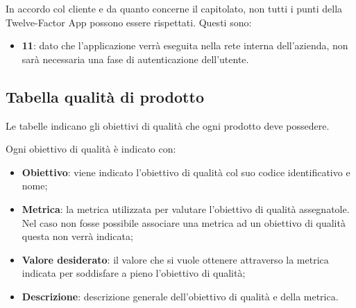 In accordo col cliente \II e da quanto concerne il capitolato, non tutti i punti della Twelve-Factor App possono essere rispettati. Questi sono:

\begin{itemize} %
	\item \textbf{11}: dato che l'applicazione verrà eseguita nella rete interna dell'azienda, non sarà necessaria una fase di autenticazione dell'utente.
\end{itemize}

\subsection{Tabella qualità di prodotto}
Le tabelle indicano gli obiettivi di qualità che ogni prodotto deve possedere.

Ogni obiettivo di qualità è indicato con:

\begin{itemize}
	\item \textbf{Obiettivo}: viene indicato l'obiettivo di qualità col suo codice identificativo e nome;
	\item \textbf{Metrica}: la metrica utilizzata per valutare l'obiettivo di qualità assegnatole. Nel caso non fosse possibile associare una metrica ad un obiettivo di qualità questa non verrà indicata;
	\item \textbf{Valore desiderato}: il valore che si vuole ottenere attraverso la metrica indicata per soddisfare a pieno l'obiettivo di qualità;
	\item \textbf{Descrizione}: descrizione generale dell'obiettivo di qualità e della metrica.
\end{itemize}


